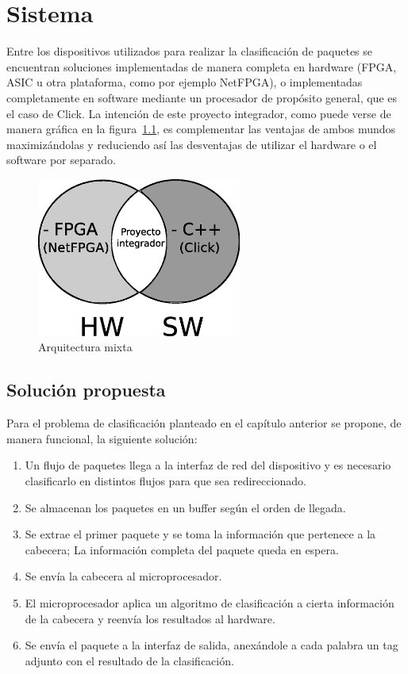 \chapter{Sistema}

Entre los dispositivos utilizados para realizar la clasificación de paquetes se encuentran soluciones implementadas de manera completa en hardware (FPGA, ASIC u otra plataforma, como por ejemplo NetFPGA\cite{netfpga}), o implementadas completamente en software mediante un procesador de propósito general, que es el caso de Click\cite{click}. La intención de este proyecto integrador, como puede verse de manera gráfica en la figura~\ref{fig:hwsw}, es complementar las ventajas de ambos mundos maximizándolas y reduciendo así las desventajas de utilizar el hardware o el software por separado. 


 \begin{figure}[h]
  \centering
	 \includegraphics[width=0.6\textwidth]{2-sistema/graf/interseccion.eps}
  \caption{Arquitectura mixta}
  \label{fig:hwsw}
\end{figure}


\section{Solución propuesta}

Para el problema de clasificación planteado en el capítulo anterior se propone, de manera funcional, la siguiente solución: 

    \begin{enumerate}
  	\item Un flujo de paquetes llega a la interfaz de red del dispositivo y es necesario clasificarlo en distintos flujos para que sea redireccionado.
	\item Se almacenan los paquetes en un buffer según el orden de llegada.
	\item Se extrae el primer paquete y se toma la información que pertenece a la cabecera; La información completa del paquete queda en espera.
	\item Se envía la cabecera al microprocesador.
	\item El microprocesador aplica un algoritmo de clasificación a cierta información de la cabecera y reenvía los resultados al hardware. 
	\item Se envía el paquete a la interfaz de salida, anexándole a cada palabra un tag adjunto con el resultado de la clasificación.
    \end{enumerate}

